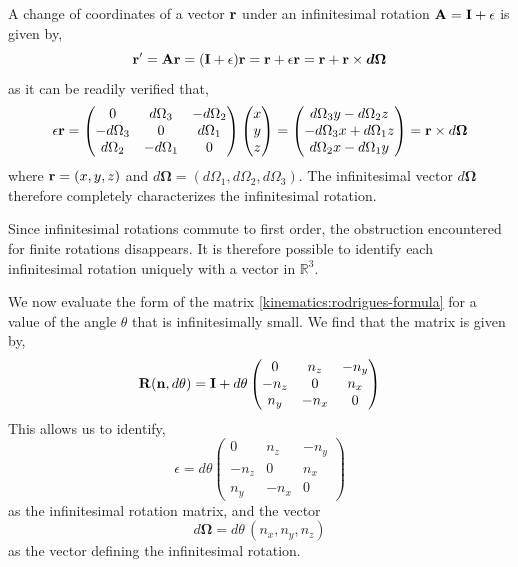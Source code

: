 \documentclass[12pt]{article}
\begin{document}
A change of coordinates of a vector $\vb{r}$ under an infinitesimal rotation
$\vb{A} = \vb{I} + \epsilon$ is given by,
\[
  \vb{r}' = \vb{A}\vb{r} = (\vb{I} + \epsilon)\vb{r} = \vb{r} + \epsilon\vb{r}
           = \vb{r} + \vb{r} \times \boldsymbol{d\Omega}
\]
as it can be readily verified that,
\[
  \epsilon\vb{r} =
  \begin{pmatrix}
    0           &  d\Omega_3 & -d\Omega_2 \\
    -d\Omega_3  &  0         &  d\Omega_1 \\
    d\Omega_2   & -d\Omega_1 &  0
  \end{pmatrix}
  \begin{pmatrix} x \\ y \\ z \end{pmatrix}
  =
  \begin{pmatrix}
    d\Omega_3 y - d\Omega_2 z \\
    -d\Omega_3 x + d\Omega_1 z \\
    d\Omega_2 x - d\Omega_1 y
  \end{pmatrix}
  = \vb{r} \times d\boldsymbol{\Omega}
\]
where $\vb{r} = (x,y,z)$ and $d\boldsymbol{\Omega} = (d\Omega_1, d\Omega_2, d\Omega_3)$.
The infinitesimal vector $d\boldsymbol{\Omega}$ therefore completely characterizes the infinitesimal rotation.

Since infinitesimal rotations commute to first order, the obstruction encountered for finite
rotations disappears. It is therefore possible to identify each infinitesimal rotation
uniquely with a vector in $\mathbb{R}^3$.

We now evaluate the form of the matrix \eqref{kinematics:rodrigues-formula} for a value of the angle
$\theta$ that is infinitesimally small. We find that the matrix is given by,
\[
  \vb{R}(\vb{n}, d\theta) = \vb{I} + d\theta
  \begin{pmatrix}
    0     &  n_z  & -n_y \\
    -n_z  &  0    &  n_x \\
    n_y   & -n_x  &  0
  \end{pmatrix}
\]
This allows us to identify,
\[
  \epsilon = d\theta
  \begin{pmatrix}
    0     &  n_z  & -n_y \\
    -n_z  &  0    &  n_x \\
    n_y   & -n_x  &  0
  \end{pmatrix}
\]
as the infinitesimal rotation matrix, and the vector
\[
  d\boldsymbol{\Omega} = d\theta\,(n_x, n_y, n_z)
\]
as the vector defining the infinitesimal rotation.
\end{document}
